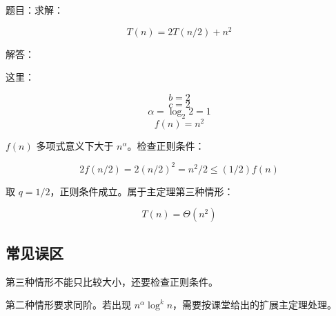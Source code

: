 \documentclass[UTF8,zihao=-4]{ctexart}
\begin{document}
题目：求解：

\[T(n) = 2T(n/2) + n^{2}\]

解答：

这里：

\[b = 2\]
\[c = 2\]
\[\alpha = \log_2 2 = 1\]
\[f(n) = n^{2}\]

$f(n)$ 多项式意义下大于 $n^\alpha$。检查正则条件：

\[2f(n/2) = 2(n/2)^{2} = n^{2}/2 \le  (1/2)f(n)\]

取 $q = 1/2$，正则条件成立。属于主定理第三种情形：

\[T(n) = \Theta(n^{2})\]

\subsection*{常见误区}

第三种情形不能只比较大小，还要检查正则条件。

第二种情形要求同阶。若出现 $n^\alpha \log^k n$，需要按课堂给出的扩展主定理处理。
\end{document}
